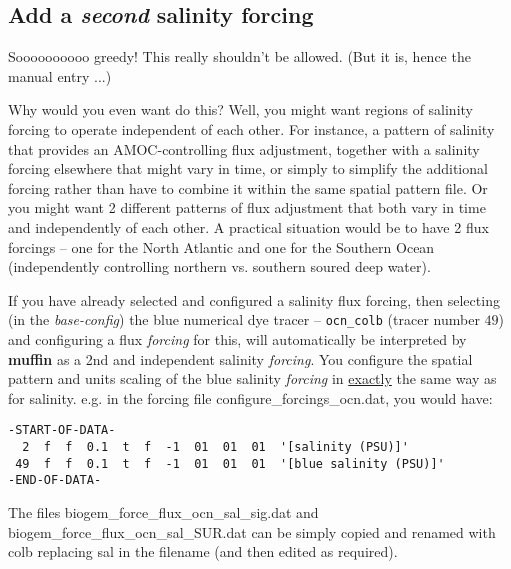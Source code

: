 \documentclass[11pt,fleqn]{book} %
\begin{document}
%
\newpage
\subsection*{Add a \textit{second} salinity forcing}
\vspace{1mm}

Soooooooooo greedy! This really shouldn't be allowed. (But it is, hence the manual entry ...)

Why would you even want do this? Well, you might want regions of salinity forcing to operate independent of each other. For instance, a pattern of salinity that provides an AMOC-controlling flux adjustment, together with a salinity forcing elsewhere that might vary in time, or simply to simplify the additional forcing rather than have to combine it within the same spatial pattern file. Or you might want 2 different patterns of flux adjustment that both vary in time and independently of each other. A practical situation would be to have 2 flux forcings -- one for the North Atlantic and one for the Southern Ocean (independently controlling northern vs. southern soured deep water).

If you have already selected and configured a salinity flux forcing, then selecting (in the \textit{base-config}) the blue numerical dye tracer -- \texttt{ocn\_colb} (tracer number \(49\)) and configuring a flux \textit{forcing} for this, will automatically be interpreted by \textbf{muffin} as a 2nd and independent salinity \textit{forcing}. You configure the spatial pattern and units scaling of the blue salinity \textit{forcing} in \uline{exactly} the same way as for salinity. e.g. in the forcing file \textsf{\footnotesize configure\_forcings\_ocn.dat}, you would have:

\vspace{-2mm}\small\begin{verbatim}
-START-OF-DATA-
  2  f  f  0.1  t  f  -1  01  01  01  '[salinity (PSU)]'
 49  f  f  0.1  t  f  -1  01  01  01  '[blue salinity (PSU)]'
-END-OF-DATA-
\end{verbatim}\normalsize\vspace{-2mm}

The files \textsf{\footnotesize biogem\_force\_flux\_ocn\_sal\_sig.dat} and \textsf{\footnotesize biogem\_force\_flux\_ocn\_sal\_SUR.dat} can be simply copied and renamed with \textsf{\footnotesize colb} replacing \textsf{\footnotesize sal} in the filename (and then edited as required).
\end{document}
